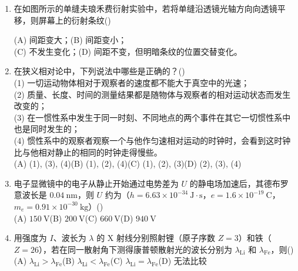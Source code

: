\documentclass[zihao=5,a4paper,UTF8]{ctexart}
\newcommand{\choicebox}{\hfill(\hspace{1.8em})}
\begin{document}
\begin{enumerate}[leftmargin=2em, itemsep=6pt]
    \item 在如图所示的单缝夫琅禾费衍射实验中，若将单缝沿透镜光轴方向向透镜平移，则屏幕上的衍射条纹\choicebox\\
    \begin{minipage}[t]{0.65\textwidth}
    (A) 间距变大；\qquad (B) 间距变小；\\
    (C) 不发生变化；\qquad (D) 间距不变，但明暗条纹的位置交替变化。
    \end{minipage}%
    \begin{minipage}[t]{0.32\textwidth}
    \centering
    \end{minipage}

    \item 在狭义相对论中，下列说法中哪些是正确的？\choicebox\\
    (1) 一切运动物体相对于观察者的速度都不能大于真空中的光速；\\
    (2) 质量、长度、时间的测量结果都是随物体与观察者的相对运动状态而发生改变的；\\
    (3) 在一惯性系中发生于同一时刻、不同地点的两个事件在其它一切惯性系中也是同时发生的；\\
    (4) 惯性系中的观察者观察一个与他作匀速相对运动的时钟时，会看到这时钟比与他相对静止的相同的时钟走得慢些。\\
    (A) (1), (3), (4)\qquad (B) (1), (2), (4)\qquad (C) (1), (2), (3)\qquad (D) (2), (3), (4)

    \item 电子显微镜中的电子从静止开始通过电势差为 $U$ 的静电场加速后，其德布罗意波长是 $0.04\ \mathrm{nm}$，则 $U$ 约为（$h=6.63\times 10^{-34}\ \mathrm{J\cdot s}$，$e=1.6\times 10^{-19}\ \mathrm{C}$，$m_e=0.91\times 10^{-30}\ \mathrm{kg}$）\choicebox\\
    (A) $150\ \mathrm{V}$\qquad (B) $200\ \mathrm{V}$\qquad (C) $660\ \mathrm{V}$\qquad (D) $940\ \mathrm{V}$

    \item 用强度为 $I$、波长为 $\lambda$ 的 X 射线分别照射锂（原子序数 $Z=3$）和铁（$Z=26$），若在同一散射角下测得康普顿散射光的波长分别为 $\lambda_{\mathrm{Li}}$ 和 $\lambda_{\mathrm{Fe}}$，则\choicebox\\
    (A) $\lambda_{\mathrm{Li}} > \lambda_{\mathrm{Fe}}$\qquad (B) $\lambda_{\mathrm{Li}} < \lambda_{\mathrm{Fe}}$\qquad (C) $\lambda_{\mathrm{Li}} = \lambda_{\mathrm{Fe}}$\qquad (D) 无法比较


\end{enumerate}
\end{document}
